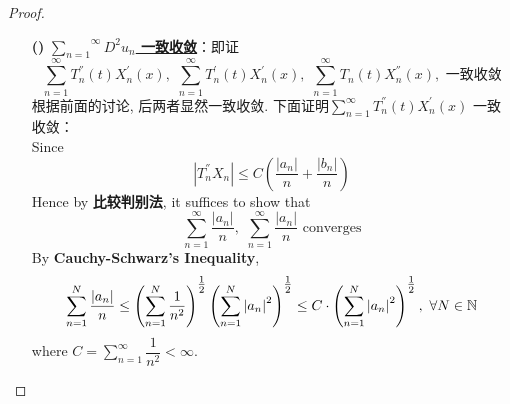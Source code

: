 \begin{thm}
\begin{proof}
\begin{itemize}
\begin{enumerate}
\begin{enumerate}
						\item[\textbf{(\rmnum{3})}]\textbf{\underline{$\overset{\infty}{\underset{n = 1}{\sum}} D^2u_n$ 一致收敛}}：即证 
						\[ \sum_{n = 1}^{\infty} T_{n}^{''}(t) X_{n}^{'}(x) , \,\, \sum_{n = 1}^{\infty} T_{n}^{'}(t) X_{n}^{'}(x) , \,\, \sum_{n = 1}^{\infty} T_{n}(t) X_{n}^{''}(x) , \,\, \text{一致收敛} \]
						根据前面的讨论, 后两者显然一致收敛. 下面证明$\sum_{n = 1}^{\infty} T_{n}^{''}(t) X_{n}^{'}(x)$ 一致收敛：\\
						Since 
						\[ \left| T_{n}^{''} X_n \right| \leq C \left( \frac{\left| a_n \right|}{n} + \frac{\left| b_n \right|}{n} \right) \]
						Hence by \textbf{比较判别法}, it suffices to show that 
						\[ \sum_{n = 1}^{\infty} \frac{\left| a_n \right|}{n} , \,\, \sum_{n = 1}^{\infty} \frac{\left| a_n \right|}{n} \,\, \text{converges} \]
						By \textbf{Cauchy-Schwarz's Inequality}, 
						\begin{align*}
							\sum_{n = 1}^{N} \frac{\left| a_n \right|}{n} 
							\leq \left( \sum_{n = 1}^N \frac{1}{n^2} \right)^{\tfrac{1}{2}} \left( \sum_{n = 1}^{N} \left| a_n \right|^2 \right)^{\tfrac{1}{2}} 
							\leq C \cdot  \left( \sum_{n = 1}^{N} \left| a_n \right|^2 \right)^{\tfrac{1}{2}} , \,\, \forall N \in \mathbb{N}
						\end{align*}
						where $C = \sum_{n = 1}^{\infty} \dfrac{1}{n^2} < \infty$. 
						
						\vspace*{4em}
						

\end{enumerate}
\end{enumerate}
\end{itemize}
\end{proof}
\end{thm}
